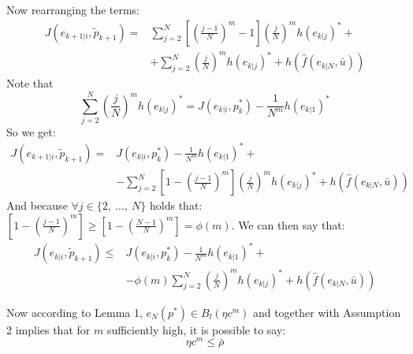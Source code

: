 Now rearranging the terms: 
\begin{equation*}
    \begin{split}
        J({e}_{k+1|i},\tilde{p}_{k+1})=&\sum_{j=2}^{N}\left[\left(\frac{j-1}{N}\right)^m-1\right]\left(\frac{j}{N}\right)^m h(e_{k|j})^*+ \\
        &+\sum_{j=2}^{N}\left(\frac{j}{N}\right)^m h(e_{k|j})^* + h(\hat{f}(e_{k|N},\bar{u}))
    \end{split}
\end{equation*}
Note that 
\begin{equation*}
	\sum_{j=2}^{N}\left(\frac{j}{N}\right)^m h(e_{k|j})^*=J({e}_{k|i},p_{k}^*)-\frac{1}{N^m}h(e_{k|1})^*
\end{equation*}
So we get:
\begin{equation*}
    \begin{split}
        J({e}_{k+1|i},\tilde{p}_{k+1})=&J({e}_{k|i},p_{k}^*)-\frac{1}{N^m}h(e_{k|1})^*+ \\ 
        &-\sum_{j=2}^{N}\left[1-\left(\frac{j-1}{N}\right)^m\right]\left(\frac{j}{N}\right)^m h(e_{k|j})^*+ h(\hat{f}(e_{k|N},\bar{u}))
    \end{split}
\end{equation*}
And because $\forall j \in \lbrace2,\ \dots,\ N\rbrace$ holds that: 
$\left[ 1-\left(\frac{j-1}{N}\right)^m \right]\ge\left[ 1-\left(\frac{N-1}{N}\right)^m \right]= \phi(m)$. We can then say that: 
\begin{equation}\label{dim1}
    \begin{split}
        J({e}_{k|i},\tilde{p}_{k+1})\le &J({e}_{k|i},p_{k}^*) - \frac{1}{N^m}h(e_{k|1})^*+ \\ 
        &-\phi(m)\sum_{j=2}^{N}\left(\frac{j}{N}\right)^m h(e_{k|j})^*+ h(\hat{f}(e_{k|N},\bar{u}))
    \end{split}
\end{equation}

Now according to Lemma 1, $e_N(p^*) \in B_l(\eta c^m)$ and together with Assumption 2 implies that for $m$ sufficiently high, it is possible to say:
\begin{equation}
\eta c^m \leq \bar{\rho}
\end{equation}

